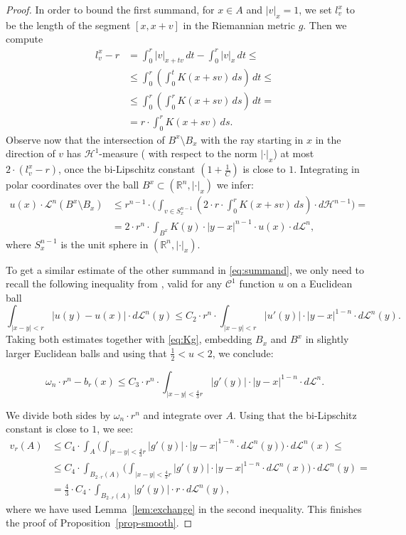 \documentclass[12pt,leqno,intlimits]{amsart}
\numberwithin{equation}{section}
\theoremstyle{definition}
\theoremstyle{remark}
\newcommand{\lref}[1]{Lemma~\ref{#1}}
\newcommand{\R}{\mathbb{R}}
\begin{document}
\begin{proof}
In order to bound the first summand, for $x\in A$ and $|v|_x=1$, we set $l^x_v$ to be the length of the segment $[x,x+v]$
in the Riemannian metric $g$. Then we compute
\begin{align*}
l_v ^x -r
&=
\int _0 ^r |v|_{x+tv} \, dt - \int _0 ^r |v|_x \, dt 
\leq
\\
&\leq \int _0 ^r (\int _0 ^t K(x+sv) \, ds)\, dt 
\leq 
\\
&\leq \int _0 ^r (\int _0 ^r K(x+sv) \, ds)\, dt 
=
\\
&= r\cdot \int _0 ^r K(x+sv) \, ds.
\end{align*}
Observe now that the intersection of $B^x\setminus B_x$ with the ray starting in $x$ in the direction of $v$ has $\mathcal H^1$-measure
( with respect to the norm $|\cdot |_x$)
at most $2\cdot (l_v^x -r)$, once the bi-Lipschitz constant $(1+\frac 1 C)$ is close to $1$.
Integrating in polar coordinates over the ball $B^x\subset (\R^n, |\cdot|_x)$ we infer:
\begin{align*}
u(x)\cdot \mathcal L^n (B^x\setminus B_x) 
&\leq r^{n-1} \cdot \Big (\int _{v\in S^{n-1} _x} ( 2\cdot r \cdot \int _0 ^r K(x+sv) \, ds)
\cdot d\mathcal H^{n-1} \Big ) =
\\&=2{\cdot}r^n \cdot \int _{B^x} K(y) \cdot |y-x|^{n-1} \cdot u(x) \cdot d\mathcal L^n,
\end{align*}
where $S^{n-1} _x$ is the unit sphere in $(\R^n, |\cdot|_x)$.

To get a similar estimate of the other summand in \eqref{eq:summand},
we only need to recall the following inequality from \cite[Lemma 4.1]{Evans}, valid for any $\mathcal C^1$ function $u$ on a Euclidean ball
\[
\int _{|x-y| < r} |u(y)-u(x)| \cdot d\mathcal L^n (y) \leq C_2\cdot r^{n}\cdot \int _{|x-y| < r}|u'(y)| \cdot |y-x| ^{1-n} \cdot d\mathcal L^n (y).
\]
Taking both estimates together with \eqref{eq:Kg}, embedding $B_x$ and $B^x$ in slightly larger Euclidean balls and using that $\frac 1 2 < u <2$, we conclude:

\[
\omega _n \cdot r^n - b_r (x) \leq C_3\cdot r^n \cdot \int _{|x-y|< \frac 4 3 r} |g'(y)| \cdot |y-x|^{1-n} \cdot d\mathcal L^n.
\]

We divide both sides by $\omega _n \cdot r^n$ and integrate over $A$. Using that the bi-Lipschitz constant is close to $1$, we see:
\begin{align*}
v_r (A) &\leq C_4\cdot \int _A \Big (\int _{|x-y|< \frac 4 3 r} |g'(y)| \cdot |y-x|^{1-n}\cdot d\mathcal L^n (y) \Big ) \cdot d\mathcal L^n (x) \leq
\\
&\leq C_4\cdot \int _{B_{2{\cdot}r} (A)} \Big ( \int _{|x-y|< \frac 4 3 r} |g'(y)| \cdot |y-x|^{1-n} \cdot d\mathcal L^n (x) \Big ) \cdot d\mathcal L^n (y) = 
\\
&= \frac 4 3\cdot  C_4\cdot \int _{B_{2{\cdot}r} (A)} |g'(y)| \cdot r \cdot d\mathcal L^n (y),
\end{align*}
where we have used \lref{lem:exchange} in the second inequality.
This finishes the proof of Proposition~\ref{prop-smooth}.
\end{proof}
\end{document}
